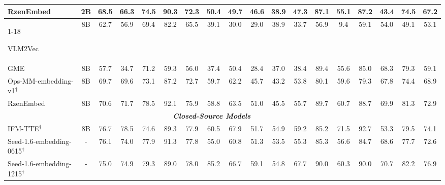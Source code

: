 \begin{table}[!t]
{\begin{tabular}{l c ccccc ccccc ccccc c}
		RzenEmbed~\citep{jian2025rzenembed} 
        & 2B  &
		68.5& 66.3 & 74.5 & 90.3 & 72.3 & 
		50.4& 49.7 & 46.6 & 38.9 & 47.3 & 
		87.1& 55.1 & 87.2 & 43.4 & 74.5 & 67.2
		\\
		
		\cmidrule{1-18}
		
		VLM2Vec~\citep{jiang2025vlm2vec} 
        & 8B &
        62.7 & 56.9 & 69.4 & 82.2 & 65.5 & 
        39.1 & 30.0 & 29.0 & 38.9 & 33.7 & 
        56.9 &  9.4 & 59.1 & 54.0 & 49.1 & 
        53.1 \\
		
		GME~\citep{zhang2025bridging} 
        & 8B  &
        57.7 & 34.7 & 71.2 & 59.3 & 56.0 & 
        37.4 & 50.4 & 28.4 & 37.0 & 38.4 & 
        89.4 & 55.6 & 85.0 & 68.3 & 79.3 & 
        59.1 \\
		
		Ops-MM-embedding-v1\href{https://huggingface.co/OpenSearch-AI/Ops-MM-embedding-v1-7B}{$\textsuperscript{\dag}$} 
        & 8B &
        69.7 & 69.6 & 73.1 & 87.2 & 72.7 & 
        59.7 & 62.2 & 45.7 & 43.2 & 53.8 & 
        80.1 & 59.6 & 79.3 & 67.8 & 74.4 & 
        68.9 \\
		
		RzenEmbed~\citep{jian2025rzenembed} 
        & 8B  &
        70.6 & 71.7 & 78.5 & 92.1 & 75.9 & 
        58.8 & 63.5 & 51.0 & 45.5 & 55.7 & 
        89.7 & 60.7 & 88.7 & 69.9 & 81.3 & 
        72.9 \\

        \midrule
        \multicolumn{17}{c}{\textbf{\emph{Closed-Source Models}}} \\ 
        \midrule
        IFM-TTE\href{https://interestfm-tte.github.io/}{$\textsuperscript{\dag}$} 
                    & 8B &
					76.7 & 78.5 & 74.6 & 89.3 & 77.9 & 
					60.5 & 67.9 & 51.7 & 54.9 & 59.2 & 
					85.2 & 71.5 & 92.7 & 53.3 & 79.5 & 74.1\\

        Seed-1.6-embedding-0615\href{https://seed1-6-embedding.github.io/}{$\textsuperscript{\dag}$} & - &
					76.1 & 74.0 & 77.9 & 91.3 & 77.8 & 
					55.0 & 60.8 & 51.3 & 53.5 & 55.3 & 
					85.3 & 56.6 & 84.7 & 68.6 & 77.7 & 72.6 \\

        Seed-1.6-embedding-1215\href{https://seed1-6-embedding.github.io/}{$\textsuperscript{\dag}$} & - &
                    75.0 & 74.9 & 79.3 & 89.0 & 78.0 & 
                    85.2 & 66.7 & 59.1 & 54.8 & 67.7 & 
                    90.0 & 60.3 & 90.0 & 70.7 & 82.2 & 
                    76.9 \\
        

\end{tabular}}
\end{table}
